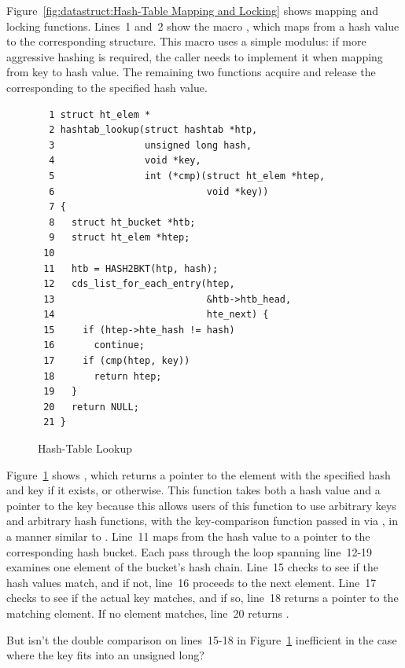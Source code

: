 Figure~\ref{fig:datastruct:Hash-Table Mapping and Locking}
shows mapping and locking functions.
Lines~1 and~2 show the macro , which maps from a hash value
to the corresponding  structure.
This macro uses a simple modulus: if more aggressive hashing is required,
the caller needs to implement it when mapping from key to hash value.
The remaining two functions acquire and release the 
corresponding to the specified hash value.

\begin{figure}[tb]
{ \scriptsize
\begin{verbatim}
  1 struct ht_elem *
  2 hashtab_lookup(struct hashtab *htp,
  3                unsigned long hash,
  4                void *key,
  5                int (*cmp)(struct ht_elem *htep,
  6                           void *key))
  7 {
  8   struct ht_bucket *htb;
  9   struct ht_elem *htep;
 10 
 11   htb = HASH2BKT(htp, hash);
 12   cds_list_for_each_entry(htep,
 13                           &htb->htb_head,
 14                           hte_next) {
 15     if (htep->hte_hash != hash)
 16       continue;
 17     if (cmp(htep, key))
 18       return htep;
 19   }
 20   return NULL;
 21 }
\end{verbatim}
}
\caption{Hash-Table Lookup}
\label{fig:datastruct:Hash-Table Lookup}
\end{figure}

Figure~\ref{fig:datastruct:Hash-Table Lookup}
shows ,
which returns a pointer to the element with the specified hash and key if it
exists, or  otherwise.
This function takes both a hash value and a pointer to the key because
this allows users of this function to use arbitrary keys and
arbitrary hash functions, with the key-comparison function passed in via
, in a manner similar to .
Line~11 maps from the hash value to a pointer to the corresponding
hash bucket.
Each pass through the loop spanning line~12-19 examines one element
of the bucket's hash chain.
Line~15 checks to see if the hash values match, and if not, line~16
proceeds to the next element.
Line~17 checks to see if the actual key matches, and if so,
line~18 returns a pointer to the matching element.
If no element matches, line~20 returns .

\QuickQuiz{}
	But isn't the double comparison on lines~15-18 in
	Figure~\ref{fig:datastruct:Hash-Table Lookup} inefficient
	in the case where the key fits into an unsigned long?
 \QuickQuizEnd

